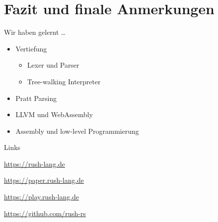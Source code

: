 \section{Fazit und finale Anmerkungen}
\begin{frame}{Wir haben gelernt \dots}
	\begin{itemize}
		\item<1-> Vertiefung
			\begin{itemize}
				\item <1-> Lexer und Parser
				\item <1-> Tree-walking Interpreter
			\end{itemize}
		\item<2-> Pratt Parsing
		\item<3-> LLVM und WebAssembly
		\item<4-> Assembly und low-level Programmierung
	\end{itemize}
\end{frame}

\begin{frame}{Links}
	\centering
	\begin{minipage}{.5\textwidth}
		\begin{description}
			\item<1->[rush Website] \url{https://rush-lang.de}
			\item<2->[Paper] \url{https://paper.rush-lang.de}
			\item<3->[Playground] \url{https://play.rush-lang.de}
			\item<4->[GitHub] \url{https://github.com/rush-rs}
		\end{description}
	\end{minipage}
\end{frame}

